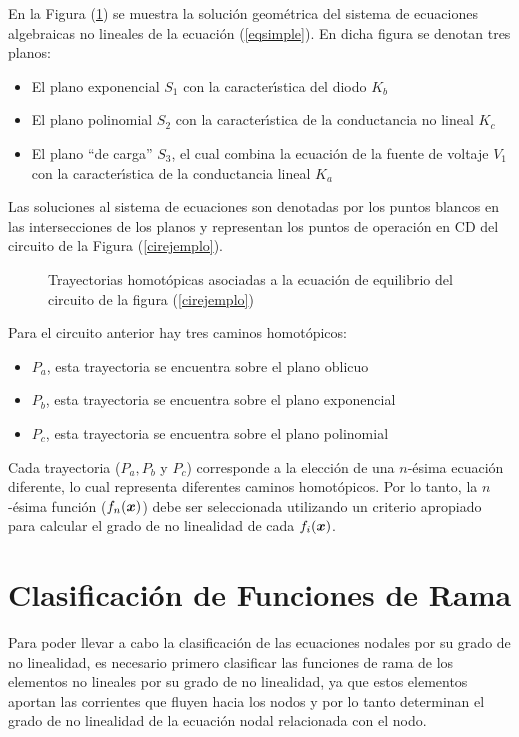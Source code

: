 \documentclass[conference,letterpaper,onecolumn]{IEEEtran}
\newcommand{\pig}[1]{\mbox{\boldmath ${#1}$}	}
\begin{document}
En la Figura (\ref{rutas}) se muestra la soluci\'on geom\'etrica del sistema
de ecuaciones algebraicas no lineales de la ecuaci\'on (\ref{eqsimple}).
En dicha figura se denotan tres planos:
\begin{itemize}
\item  El plano exponencial $S_1$ con la caracter\'{\i}stica del
diodo $K_b$
\item  El plano polinomial $S_2$ con la caracter\'{\i}stica de la
conductancia no lineal $K_c$
\item  El plano ``de carga'' $S_3$, el cual combina la ecuaci\'on de
la fuente de voltaje $V_1$ con la caracter\'{\i}stica de la
conductancia lineal $K_a$
\end{itemize}
Las soluciones al sistema de ecuaciones son denotadas por los puntos
blancos en las intersecciones de los planos y representan los puntos
de operaci\'on en CD del circuito de la Figura (\ref{cirejemplo}).

\begin{figure}[!h]
\centerline{
\epsfxsize=70mm
}
\caption{Trayectorias homot\'opicas asociadas a la ecuaci\'on de e\-qui\-li\-brio
del circuito de la figura (\ref{cirejemplo})}
\label{rutas}
\end{figure}

Para el circuito anterior hay tres caminos homot\'opicos:
\begin{itemize}
\item $P_a$, esta trayectoria se encuentra sobre el plano oblicuo
\item $P_b$, esta trayectoria se encuentra sobre el plano exponencial
\item $P_c$, esta trayectoria se encuentra sobre el plano polinomial
\end{itemize}
Cada trayectoria ($P_a,P_b$ y $P_c$) corresponde a la elecci\'on de una
$n$-\'esima ecuaci\'on diferente, lo cual representa diferentes caminos
homot\'opicos. Por lo tanto, la $n$-\'esima funci\'on ($f_n(\pig{x})$) debe ser
seleccionada utilizando un criterio apropiado para calcular el grado de no linealidad de cada $f_i(\pig{x})$.


\section{Clasificaci\'on de Funciones de Rama}
\label{cfr}
Para poder llevar a cabo la clasificaci\'on de las ecuaciones nodales
por su grado de no linealidad, es necesario primero clasificar las
funciones de rama de los elementos no lineales por su grado de no
linealidad, ya que estos elementos aportan las corrientes que fluyen
hacia los nodos y por lo tanto determinan el grado de no linealidad
de la ecuaci\'on nodal relacionada con el nodo.
\end{document}

